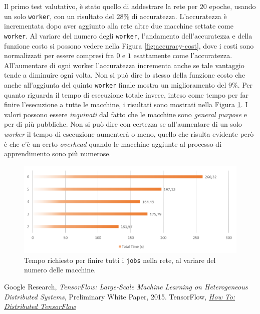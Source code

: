 \documentclass[DIV=calc, paper=a4, fontsize=11pt]{scrartcl}	 %
\begin{document}
\begin{multicols}{2}
			Il primo test valutativo, è stato quello di addestrare la rete per $20$ epoche, usando un solo \texttt{worker}, con un risultato del $28$\% di accuratezza. L'accuratezza è incrementata dopo aver aggiunto alla rete altre due macchine settate come \texttt{worker}. Al variare del numero degli \texttt{worker}, l'andamento dell'accuratezza e della funzione costo si possono vedere nella Figura \ref{fig:accuracy-cost}, dove i costi sono normalizzati per essere compresi fra $0$ e $1$ esattamente come l'accuratezza. All'aumentare di ogni worker l'accuratezza incrementa anche se tale vantaggio tende a diminuire ogni volta. Non si può dire lo stesso della funzione costo che anche all'aggiunta del quinto \texttt{worker} finale mostra un miglioramento del $9$\%. Per quanto riguarda il tempo di esecuzione totale invece, inteso come tempo per far finire l'esecuzione a tutte le macchine, i risultati sono mostrati nella Figura \ref{fig:total-time}. I valori possono essere \textit{inquinati} dal fatto che le macchine sono \textit{general purpose} e per di più pubbliche. Non si può dire con certezza se all'aumentare di un solo \textit{worker} il tempo di esecuzione aumenterà o meno, quello che risulta evidente però è che c'è un certo \textit{overhead} quando le macchine aggiunte al processo di apprendimento sono più numerose.
			\begin{figure}[th!]
				\centering
				\includegraphics[scale=.95]{img/total-time.png}
				\caption{Tempo richiesto per finire tutti i \texttt{jobs} nella rete, al variare del numero delle macchine.}
				\label{fig:total-time}
			\end{figure}
			
		\begin{thebibliography}{9}
			Google Research,
			\emph{TensorFlow: Large-Scale Machine Learning on Heterogeneous Distributed Systems},
			Preliminary White Paper,
			2015.
			TensorFlow,
			\emph{\href{https://www.tensorflow.org/versions/r0.10/how_tos/distributed/}{How To: Distributed TensorFlow}}
		\end{thebibliography}
	\end{multicols}
\end{document}
